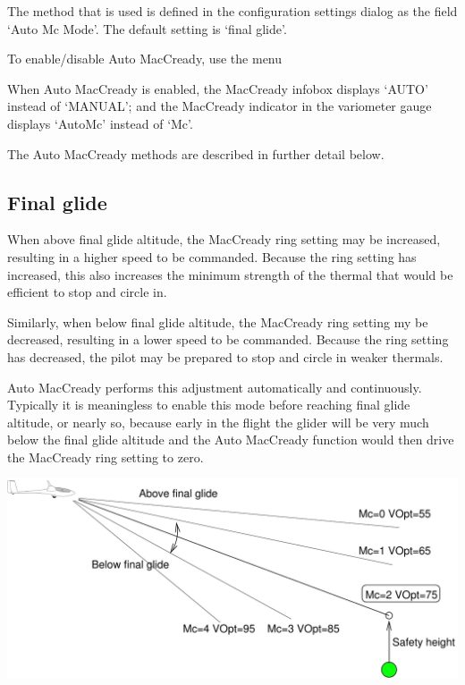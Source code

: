 \documentclass[a4paper,12pt]{refrep}
\begin{document}
The method that is used is defined in the configuration settings dialog 
as the field `Auto Mc Mode'.  The default setting is `final glide'.

To enable/disable Auto MacCready, use the menu
\begin{quote}
\blink{}
\end{quote}

When Auto MacCready is enabled, the MacCready infobox displays `AUTO'
instead of `MANUAL'; and the MacCready indicator in the variometer
gauge displays `AutoMc' instead of `Mc'.

The Auto MacCready methods are described in further detail below.

\subsection*{Final glide}
When above final glide altitude, the MacCready ring setting may be
increased, resulting in a higher speed to be commanded.  Because the
ring setting has increased, this also increases the minimum strength
of the thermal that would be efficient to stop and circle in.

Similarly, when below final glide altitude, the MacCready ring setting
my be decreased, resulting in a lower speed to be commanded.  Because
the ring setting has decreased, the pilot may be prepared to stop and
circle in weaker thermals.

Auto MacCready performs this adjustment automatically and
continuously.  Typically it is meaningless to enable this mode before
reaching final glide altitude, or nearly so, because early in the
flight the glider will be very much below the final glide altitude and
the Auto MacCready function would then drive the MacCready ring
setting to zero.

\begin{maxipage}
\begin{center}
\includegraphics[angle=0,width=0.8\linewidth,keepaspectratio='true']{figures/automc.pdf}
\end{center}
\end{maxipage}
\end{document}
